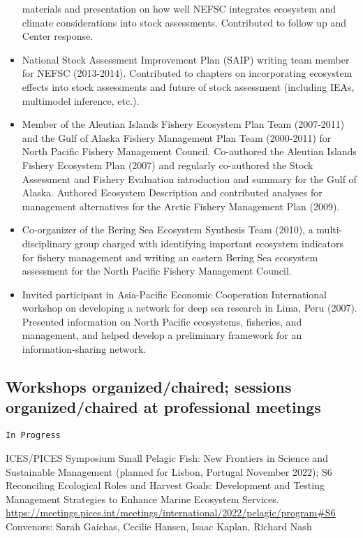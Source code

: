 \documentclass[11pt, a4paper]{awesome-cv}
\begin{document}
\begin{itemize}
  materials and presentation on how well NEFSC integrates ecosystem and
  climate considerations into stock assessments. Contributed to follow
  up and Center response.
\item
  National Stock Assessment Improvement Plan (SAIP) writing team member
  for NEFSC (2013-2014). Contributed to chapters on incorporating
  ecosystem effects into stock assessments and future of stock
  assessment (including IEAs, multimodel inference, etc.).
\item
  Member of the Aleutian Islands Fishery Ecosystem Plan Team (2007-2011)
  and the Gulf of Alaska Fishery Management Plan Team (2000-2011) for
  North Pacific Fishery Management Council. Co-authored the Aleutian
  Islands Fishery Ecosystem Plan (2007) and regularly co-authored the
  Stock Assessment and Fishery Evaluation introduction and summary for
  the Gulf of Alaska. Authored Ecosystem Description and contributed
  analyses for management alternatives for the Arctic Fishery Management
  Plan (2009).
\item
  Co-organizer of the Bering Sea Ecosystem Synthesis Team (2010), a
  multi-disciplinary group charged with identifying important ecosystem
  indicators for fishery management and writing an eastern Bering Sea
  ecosystem assessment for the North Pacific Fishery Management Council.
\item
  Invited participant in Asia-Pacific Economic Cooperation International
  workshop on developing a network for deep sea research in Lima, Peru
  (2007). Presented information on North Pacific ecosystems, fisheries,
  and management, and helped develop a preliminary framework for an
  information-sharing network.
\end{itemize}

\hypertarget{workshops-organizedchaired-sessions-organizedchaired-at-professional-meetings}{%
\subsection{Workshops organized/chaired; sessions organized/chaired at
professional
meetings}\label{workshops-organizedchaired-sessions-organizedchaired-at-professional-meetings}}

\begin{verbatim}
In Progress
\end{verbatim}

ICES/PICES Symposium Small Pelagic Fish: New Frontiers in Science and
Sustainable Management (planned for Lisbon, Portugal November 2022); S6
Reconciling Ecological Roles and Harvest Goals: Development and Testing
Management Strategies to Enhance Marine Ecosystem Services.
\url{https://meetings.pices.int/meetings/international/2022/pelagic/program\#S6}
Convenors: Sarah Gaichas, Cecilie Hansen, Isaac Kaplan, Richard Nash
\end{document}

